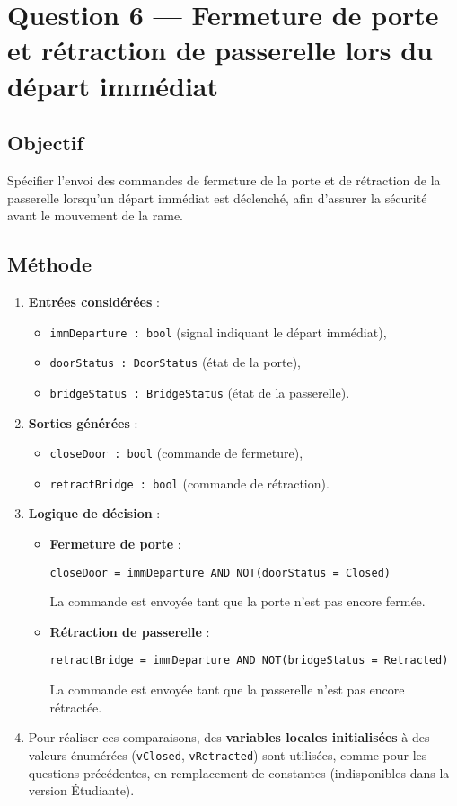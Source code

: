 \documentclass[11pt,a4paper]{report}
\begin{document}
\chapter{Question 6 — Fermeture de porte et rétraction de passerelle lors du départ immédiat}

\section*{Objectif}
Spécifier l’envoi des commandes de fermeture de la porte et de rétraction de la passerelle lorsqu’un départ immédiat est déclenché, afin d’assurer la sécurité avant le mouvement de la rame.

\section*{Méthode}
\begin{enumerate}
  \item \textbf{Entrées considérées} :
  \begin{itemize}
    \item \texttt{immDeparture : bool} (signal indiquant le départ immédiat),
    \item \texttt{doorStatus : DoorStatus} (état de la porte),
    \item \texttt{bridgeStatus : BridgeStatus} (état de la passerelle).
  \end{itemize}

  \item \textbf{Sorties générées} :
  \begin{itemize}
    \item \texttt{closeDoor : bool} (commande de fermeture),
    \item \texttt{retractBridge : bool} (commande de rétraction).
  \end{itemize}

  \item \textbf{Logique de décision} :
  \begin{itemize}
    \item \textbf{Fermeture de porte} :
\begin{lstlisting}
closeDoor = immDeparture AND NOT(doorStatus = Closed)
\end{lstlisting}
    La commande est envoyée tant que la porte n’est pas encore fermée.

    \item \textbf{Rétraction de passerelle} :
\begin{lstlisting}
retractBridge = immDeparture AND NOT(bridgeStatus = Retracted)
\end{lstlisting}
    La commande est envoyée tant que la passerelle n’est pas encore rétractée.
  \end{itemize}

  \item Pour réaliser ces comparaisons, des \textbf{variables locales initialisées} à des valeurs énumérées
  (\texttt{vClosed}, \texttt{vRetracted}) sont utilisées, comme pour les questions précédentes,
  en remplacement de constantes (indisponibles dans la version Étudiante).
\end{enumerate}
\end{document}
